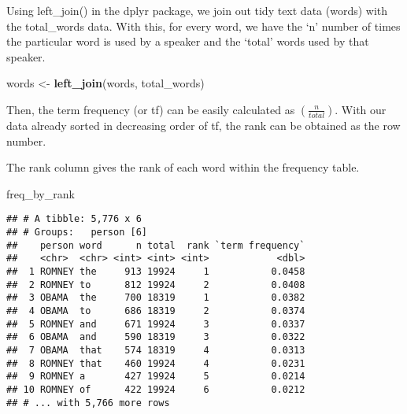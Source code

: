 \documentclass[
]{article}
\newenvironment{Shaded}{\begin{snugshade}}{\end{snugshade}}
\newcommand{\DataTypeTok}[1]{\textcolor[rgb]{0.13,0.29,0.53}{#1}}
\newcommand{\KeywordTok}[1]{\textcolor[rgb]{0.13,0.29,0.53}{\textbf{#1}}}
\newcommand{\NormalTok}[1]{#1}
\newcommand{\OperatorTok}[1]{\textcolor[rgb]{0.81,0.36,0.00}{\textbf{#1}}}
\newcommand{\StringTok}[1]{\textcolor[rgb]{0.31,0.60,0.02}{#1}}
\begin{document}
Using left\_join() in the dplyr package, we join out tidy text data
(words) with the total\_words data. With this, for every word, we have
the `n' number of times the particular word is used by a speaker and the
`total' words used by that speaker.

\begin{Shaded}
\begin{Highlighting}[]
\NormalTok{words <-}\StringTok{ }\KeywordTok{left_join}\NormalTok{(words, total_words)}
\end{Highlighting}
\end{Shaded}

Then, the term frequency (or tf) can be easily calculated as
\((\frac{n}{total})\). With our data already sorted in decreasing order
of tf, the rank can be obtained as the row number.

\begin{Shaded}
\end{Shaded}

The rank column gives the rank of each word within the frequency table.

\begin{Shaded}
\begin{Highlighting}[]
\NormalTok{freq_by_rank}
\end{Highlighting}
\end{Shaded}

\begin{verbatim}
## # A tibble: 5,776 x 6
## # Groups:   person [6]
##    person word      n total  rank `term frequency`
##    <chr>  <chr> <int> <int> <int>            <dbl>
##  1 ROMNEY the     913 19924     1           0.0458
##  2 ROMNEY to      812 19924     2           0.0408
##  3 OBAMA  the     700 18319     1           0.0382
##  4 OBAMA  to      686 18319     2           0.0374
##  5 ROMNEY and     671 19924     3           0.0337
##  6 OBAMA  and     590 18319     3           0.0322
##  7 OBAMA  that    574 18319     4           0.0313
##  8 ROMNEY that    460 19924     4           0.0231
##  9 ROMNEY a       427 19924     5           0.0214
## 10 ROMNEY of      422 19924     6           0.0212
## # ... with 5,766 more rows
\end{verbatim}
\end{document}
